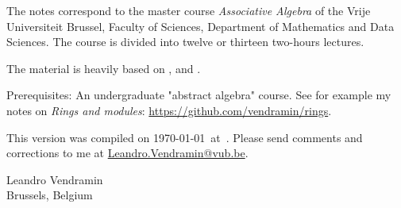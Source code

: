 \preface

The notes correspond to the master  
course \emph{Associative Algebra} of the 
Vrije Universiteit Brussel, 
Faculty of Sciences, 
Department of Mathematics and Data Sciences. The course
is divided into twelve or thirteen two-hours lectures. 

The material is heavily based on \cite{MR3308118}, \cite{MR1449137} and 
\cite{MR798076}. 

Prerequisites: An undergraduate "abstract algebra" course. See for example
my notes on \emph{Rings and modules}: \url{https://github.com/vendramin/rings}. 

\medskip
This version 
was compiled on \today~at~\currenttime.
Please send comments and corrections to me at \url{Leandro.Vendramin@vub.be}. 


\bigskip
\begin{flushright}
Leandro Vendramin\\Brussels, Belgium\par
\end{flushright}
